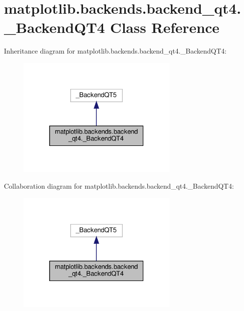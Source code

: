 \hypertarget{classmatplotlib_1_1backends_1_1backend__qt4_1_1__BackendQT4}{}\section{matplotlib.\+backends.\+backend\+\_\+qt4.\+\_\+\+Backend\+Q\+T4 Class Reference}
\label{classmatplotlib_1_1backends_1_1backend__qt4_1_1__BackendQT4}


Inheritance diagram for matplotlib.\+backends.\+backend\+\_\+qt4.\+\_\+\+Backend\+Q\+T4\+:
\nopagebreak
\begin{figure}[H]
\begin{center}
\leavevmode
\includegraphics[width=223pt]{classmatplotlib_1_1backends_1_1backend__qt4_1_1__BackendQT4__inherit__graph}
\end{center}
\end{figure}


Collaboration diagram for matplotlib.\+backends.\+backend\+\_\+qt4.\+\_\+\+Backend\+Q\+T4\+:
\nopagebreak
\begin{figure}[H]
\begin{center}
\leavevmode
\includegraphics[width=223pt]{classmatplotlib_1_1backends_1_1backend__qt4_1_1__BackendQT4__coll__graph}
\end{center}
\end{figure}
